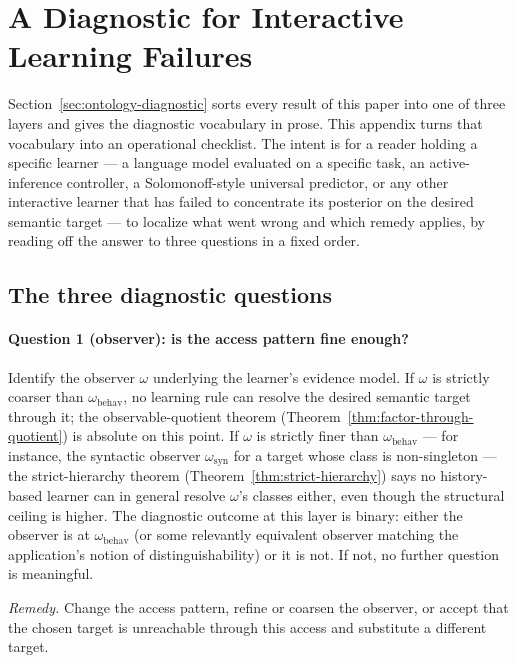 \documentclass[11pt]{article}
\theoremstyle{definition}
\theoremstyle{remark}
\begin{document}
\appendix

\section{A Diagnostic for Interactive Learning Failures}
\label{app:diagnostic}

Section~\ref{sec:ontology-diagnostic} sorts every result of this paper into one of three layers and gives the diagnostic vocabulary in prose. This appendix turns that vocabulary into an operational checklist. The intent is for a reader holding a specific learner --- a language model evaluated on a specific task, an active-inference controller, a Solomonoff-style universal predictor, or any other interactive learner that has failed to concentrate its posterior on the desired semantic target --- to localize what went wrong and which remedy applies, by reading off the answer to three questions in a fixed order.

\subsection{The three diagnostic questions}
\label{app:diagnostic-questions}

\paragraph{Question 1 (observer): is the access pattern fine enough?}
Identify the observer $\omega$ underlying the learner's evidence model. If $\omega$ is strictly coarser than $\omega_{\mathrm{behav}}$, no learning rule can resolve the desired semantic target through it; the observable-quotient theorem (Theorem~\ref{thm:factor-through-quotient}) is absolute on this point. If $\omega$ is strictly finer than $\omega_{\mathrm{behav}}$ --- for instance, the syntactic observer $\omega_{\mathrm{syn}}$ for a target whose class is non-singleton --- the strict-hierarchy theorem (Theorem~\ref{thm:strict-hierarchy}) says no history-based learner can in general resolve $\omega$'s classes either, even though the structural ceiling is higher. The diagnostic outcome at this layer is binary: either the observer is at $\omega_{\mathrm{behav}}$ (or some relevantly equivalent observer matching the application's notion of distinguishability) or it is not. If not, no further question is meaningful.

\emph{Remedy.} Change the access pattern, refine or coarsen the observer, or accept that the chosen target is unreachable through this access and substitute a different target.
\end{document}
